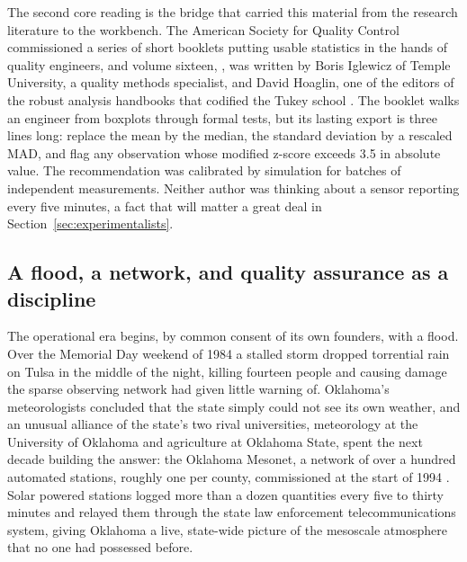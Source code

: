 The second core reading is the bridge that carried this material from the
research literature to the workbench. The American Society for Quality
Control commissioned a series of short booklets putting usable statistics in
the hands of quality engineers, and volume sixteen, , was written by Boris Iglewicz of Temple University, a
quality methods specialist, and David Hoaglin, one of the editors of the
robust analysis handbooks that codified the Tukey school
\citep{iglewicz1993}. The booklet walks an engineer from boxplots through
formal tests, but its lasting export is three lines long: replace the mean by
the median, the standard deviation by a rescaled MAD, and flag any
observation whose modified z-score exceeds 3.5 in absolute value. The
recommendation was calibrated by simulation for batches of independent
measurements. Neither author was thinking about a sensor reporting every five
minutes, a fact that will matter a great deal in
Section~\ref{sec:experimentalists}.

\subsection{A flood, a network, and quality assurance as a discipline}

The operational era begins, by common consent of its own founders, with a
flood. Over the Memorial Day weekend of 1984 a stalled storm dropped
torrential rain on Tulsa in the middle of the night, killing fourteen people
and causing damage the sparse observing network had given little warning of.
Oklahoma's meteorologists concluded that the state simply could not see its
own weather, and an unusual alliance of the state's two rival universities,
meteorology at the University of Oklahoma and agriculture at Oklahoma State,
spent the next decade building the answer: the Oklahoma Mesonet, a network of
over a hundred automated stations, roughly one per county, commissioned at
the start of 1994 \citep{brock1995}. Solar powered stations logged more than
a dozen quantities every five to thirty minutes and relayed them through the
state law enforcement telecommunications system, giving Oklahoma a live,
state-wide picture of the mesoscale atmosphere that no one had possessed
before.

